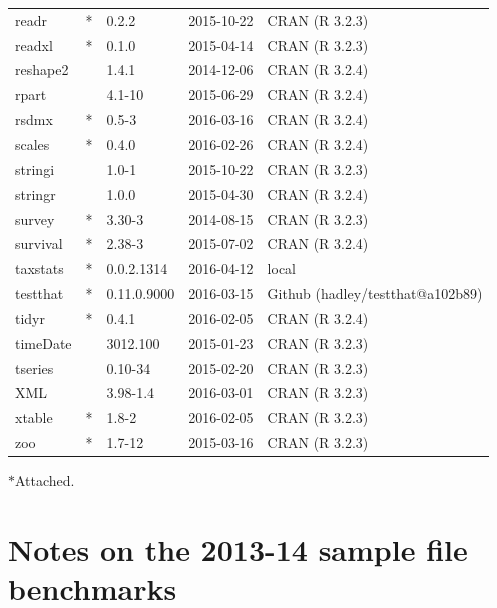 \documentclass{grattan}\usepackage[]{graphicx}\usepackage[]{color}
\begin{document}
\begin{longtable}{lllll}
  readr & * & 0.2.2 & 2015-10-22 & CRAN (R 3.2.3) \\ 
  readxl & * & 0.1.0 & 2015-04-14 & CRAN (R 3.2.3) \\ 
  reshape2 &  & 1.4.1 & 2014-12-06 & CRAN (R 3.2.4) \\ 
  rpart &  & 4.1-10 & 2015-06-29 & CRAN (R 3.2.4) \\ 
  rsdmx & * & 0.5-3 & 2016-03-16 & CRAN (R 3.2.4) \\ 
  scales & * & 0.4.0 & 2016-02-26 & CRAN (R 3.2.4) \\ 
  stringi &  & 1.0-1 & 2015-10-22 & CRAN (R 3.2.3) \\ 
  stringr &  & 1.0.0 & 2015-04-30 & CRAN (R 3.2.4) \\ 
  survey & * & 3.30-3 & 2014-08-15 & CRAN (R 3.2.3) \\ 
  survival & * & 2.38-3 & 2015-07-02 & CRAN (R 3.2.4) \\ 
  taxstats & * & 0.0.2.1314 & 2016-04-12 & local \\ 
  testthat & * & 0.11.0.9000 & 2016-03-15 & Github (hadley/testthat@a102b89) \\ 
  tidyr & * & 0.4.1 & 2016-02-05 & CRAN (R 3.2.4) \\ 
  timeDate &  & 3012.100 & 2015-01-23 & CRAN (R 3.2.3) \\ 
  tseries &  & 0.10-34 & 2015-02-20 & CRAN (R 3.2.3) \\ 
  XML &  & 3.98-1.4 & 2016-03-01 & CRAN (R 3.2.3) \\ 
  xtable & * & 1.8-2 & 2016-02-05 & CRAN (R 3.2.3) \\ 
  zoo & * & 1.7-12 & 2015-03-16 & CRAN (R 3.2.3) \\ 
   \bottomrule
\end{longtable}

$*$\quad Attached.



\twocolumn
\chapter{Notes on the 2013-14 sample file benchmarks}
\end{document}
